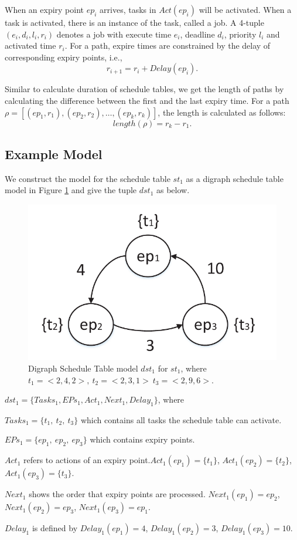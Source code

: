 \documentclass[10pt,conference]{IEEEtran}
\begin{document}
When an expiry point $ep_i$ arrives, tasks in $Act(ep_i)$ will be activated. When a task is activated, there is an instance of the task, called a job. A 4-tuple $(e_i,d_i,l_i,r_i)$ denotes a job with execute time $e_i$, deadline $d_i$, priority $l_i$ and activated time $r_i$. For a path, expire times are constrained by the delay of corresponding expiry points, i.e., 
\[r_{i+1}=r_i+Delay(ep_i).\]

Similar to calculate duration of schedule tables, we get the length of paths by calculating the difference between the first and the last expiry time. For a path $\rho=[(ep_1,r_1),(ep_2,r_2),\dots,(ep_k,r_k)]$, the length is calculated as follows: \[length(\rho)=r_k-r_1.\]


\subsection{Example Model}\label{section_dst_1}
We construct the model for the schedule table $st_1$ as a digraph schedule table model in Figure \ref{figure_dst1} and give the tuple $dst_1$ as below.
\begin{figure}
  \centering
  \includegraphics[scale=.5]{graphics/figure_dst1-eps-converted-to.pdf}
  \caption{Digraph Schedule Table model $dst_1$ for $st_1$, where $t_1=<2,4,2>,\ t_2=<2,3,1>\ t_3=<2,9,6>$.}
  \label{figure_dst1}
\end{figure}

$dst_1=\{Tasks_1,EPs_1,Act_1,Next_1,Delay_1\}$, where 
\begin{compactitem}
\item $Tasks_1=\{t_1,\ t_2,\ t_3\}$ which contains all tasks the schedule table can activate.
\item $EPs_1=\{ep_1,\ ep_2,\ ep_3\}$ which contains expiry points.
\item $Act_1$ refers to actions of an expiry point.$Act_1(ep_1)=\{t_1\}$, $Act_1(ep_2)=\{t_2\}$, $Act_1(ep_3)=\{t_3\}$.
\item $Next_1$ shows the order that expiry points are processed. $Next_1(ep_1)=ep_2$, $Next_1(ep_2)=ep_3$, $Next_1(ep_3)=ep_1$.
\item $Delay_1$ is defined by $Delay_1(ep_1)=4$, $Delay_1(ep_2)=3$, $Delay_1(ep_3)=10$.
\end{compactitem}
\end{document}
